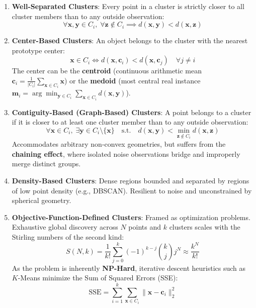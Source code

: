 \begin{enumerate}
    \item \textbf{Well-Separated Clusters}:
    Every point in a cluster is strictly closer to all cluster members than to any outside observation:
    \begin{equation}
        \forall \mathbf{x}, \mathbf{y} \in C_i, \; \forall \mathbf{z} \notin C_i \implies d(\mathbf{x}, \mathbf{y}) < d(\mathbf{x}, \mathbf{z})
    \end{equation}
    \item \textbf{Center-Based Clusters}:
    An object belongs to the cluster with the nearest prototype center:
    \begin{equation}
        \mathbf{x} \in C_i \iff d(\mathbf{x}, \mathbf{c}_i) < d(\mathbf{x}, \mathbf{c}_j) \quad \forall j \neq i
    \end{equation}
    The center can be the \textbf{centroid} (continuous arithmetic mean $\mathbf{c}_i = \frac{1}{|C_i|} \sum_{\mathbf{x} \in C_i} \mathbf{x}$) or the \textbf{medoid} (most central real instance $\mathbf{m}_i = \arg\min_{\mathbf{y} \in C_i} \sum_{\mathbf{x} \in C_i} d(\mathbf{x}, \mathbf{y})$).
    \item \textbf{Contiguity-Based (Graph-Based) Clusters}:
    A point belongs to a cluster if it is closer to at least one cluster member than to any outside observation:
    \begin{equation}
        \forall \mathbf{x} \in C_i, \; \exists \mathbf{y} \in C_i \setminus \{\mathbf{x}\} \quad \text{s.t.} \quad d(\mathbf{x}, \mathbf{y}) < \min_{\mathbf{z} \notin C_i} d(\mathbf{x}, \mathbf{z})
    \end{equation}
    Accommodates arbitrary non-convex geometries, but suffers from the \textbf{chaining effect}, where isolated noise observations bridge and improperly merge distinct groups.
    \item \textbf{Density-Based Clusters}:
    Dense regions bounded and separated by regions of low point density (e.g., DBSCAN). Resilient to noise and unconstrained by spherical geometry.
    \item \textbf{Objective-Function-Defined Clusters}:
    Framed as optimization problems. Exhaustive global discovery across $N$ points and $k$ clusters scales with the Stirling numbers of the second kind:
    \begin{equation}
        S(N, k) = \frac{1}{k!} \sum_{j=0}^k (-1)^{k-j} \binom{k}{j} j^N \approx \frac{k^N}{k!}
    \end{equation}
    As the problem is inherently \textbf{NP-Hard}, iterative descent heuristics such as $K$-Means minimize the Sum of Squared Errors (SSE):
    \begin{equation}
        \text{SSE} = \sum_{i=1}^k \sum_{\mathbf{x} \in C_i} \|\mathbf{x} - \mathbf{c}_i\|_2^2
    \end{equation}
\end{enumerate}

